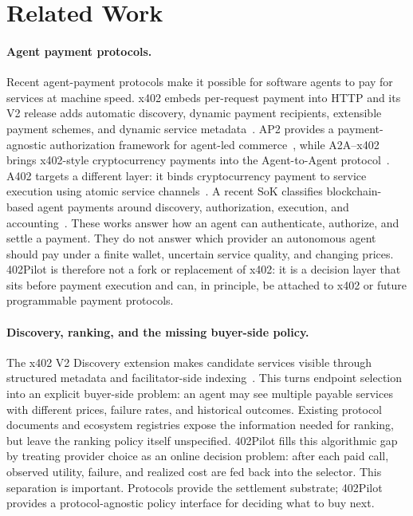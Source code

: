 \section{Related Work}
\label{sec:related-work}

\paragraph{Agent payment protocols.}
Recent agent-payment protocols make it possible for software agents to pay for services at machine speed. x402 embeds per-request payment into HTTP and its V2 release adds automatic discovery, dynamic payment recipients, extensible payment schemes, and dynamic service metadata~\citep{coinbase2025x402v2}. AP2 provides a payment-agnostic authorization framework for agent-led commerce~\citep{google2025ap2}, while A2A--x402 brings x402-style cryptocurrency payments into the Agent-to-Agent protocol~\citep{a2ax402}. A402 targets a different layer: it binds cryptocurrency payment to service execution using atomic service channels~\citep{a402}. A recent SoK classifies blockchain-based agent payments around discovery, authorization, execution, and accounting~\citep{sok2026agentpayments}. These works answer how an agent can authenticate, authorize, and settle a payment. They do not answer which provider an autonomous agent should pay under a finite wallet, uncertain service quality, and changing prices. 402Pilot is therefore not a fork or replacement of x402: it is a decision layer that sits before payment execution and can, in principle, be attached to x402 or future programmable payment protocols.

\paragraph{Discovery, ranking, and the missing buyer-side policy.}
The x402 V2 Discovery extension makes candidate services visible through structured metadata and facilitator-side indexing~\citep{coinbase2025x402v2}. This turns endpoint selection into an explicit buyer-side problem: an agent may see multiple payable services with different prices, failure rates, and historical outcomes. Existing protocol documents and ecosystem registries expose the information needed for ranking, but leave the ranking policy itself unspecified. 402Pilot fills this algorithmic gap by treating provider choice as an online decision problem: after each paid call, observed utility, failure, and realized cost are fed back into the selector. This separation is important. Protocols provide the settlement substrate; 402Pilot provides a protocol-agnostic policy interface for deciding what to buy next.


